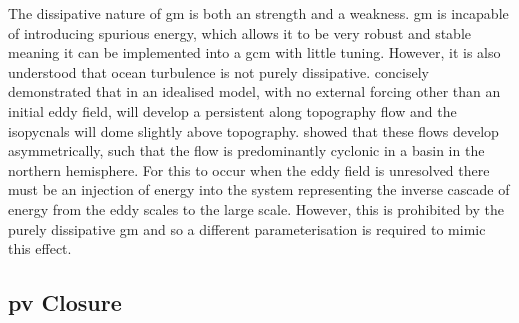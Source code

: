 \documentclass[10pt,a4paper]{report}
\begin{document}
        The dissipative nature of \gls{gm} is both an strength and a
         weakness. \gls{gm} is incapable of introducing spurious energy,
         which allows it to be very robust and stable meaning it can be implemented 
         into a \gls{gcm} with little tuning. However, it is also understood that
         ocean turbulence is not purely dissipative.
          \cite{adcock2000interactions} concisely demonstrated that
         in an idealised model, with no external forcing other
         than an initial eddy field, will develop a persistent along
         topography flow and the isopycnals will dome slightly above topography.
          \cite{nost2008asymmetry} showed that these
         flows develop asymmetrically, such that the flow is 
         predominantly cyclonic in
         a basin in the northern hemisphere. For this to occur 
         when the eddy field is unresolved there must be an 
         injection of energy into the system representing the 
         inverse cascade of energy from the eddy scales to the large scale.
         However, this is prohibited by the purely dissipative \gls{gm}
         and so a different parameterisation is required to mimic this
         effect.
         
         
         
         \subsection{\gls{pv} Closure}
         
\end{document}
